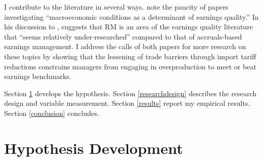 \documentclass[notitlepage, 12pt]{article}
\begin{document}
\noindent I contribute to the literature in several ways. \citet*[p. 386]{dgs:2010} note the paucity of papers investigating ``macroeconomic conditions as a determinant of earnings quality.'' In his discussion to \citeauthor{dgs:2010}, \citet{defond:2010} suggests that RM is an area of the earnings quality literature that ``seems relatively under-researched'' compared to that of accruals-based earnings management. I address the calls of both papers for more research on these topics by showing that the lessening of trade barriers through import tariff reductions constrains managers from engaging in overproduction to meet or beat earnings benchmarks.
\newline

\noindent Section \ref{hypothesis} develops the hypothesis. Section \ref{researchdesign} describes the research design and variable measurement. Section \ref{results} report my empirical results. Section \ref{conclusion} concludes.

\section{Hypothesis Development}\label{hypothesis}

\end{document}
